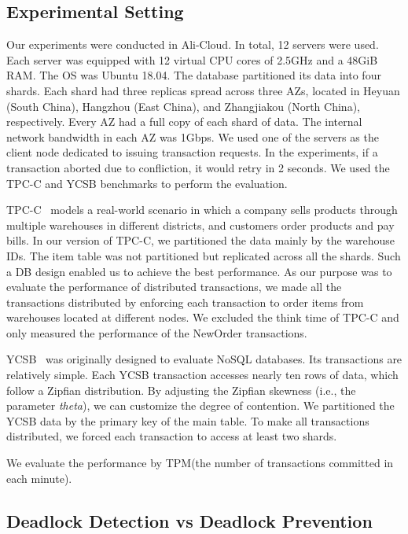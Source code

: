 \documentclass[conference]{IEEEtran}
\begin{document}
\subsection{Experimental Setting}
\label{subsec:exp_setting}

Our experiments were conducted in Ali-Cloud.
In total, 12 servers were used.
Each server was equipped with 12 virtual CPU cores of 2.5GHz and a 48GiB RAM.
The OS was Ubuntu 18.04.
The database partitioned its data into four shards.
Each shard had three replicas spread across three AZs,
located in Heyuan (South China), Hangzhou (East China), and Zhangjiakou (North China), respectively.
Every AZ had a full copy of each shard of data.
The internal network bandwidth in each AZ was 1Gbps.
We used one of the servers as the client node dedicated to issuing transaction requests.
In the experiments, if a transaction aborted due to confliction, it would retry in 2 seconds.
We used the TPC-C and YCSB benchmarks to perform the evaluation.


TPC-C~\cite{TPCC:conf/tpctc/NambiarWMTLCM11} models a real-world scenario in which a company sells products through multiple warehouses in different districts, and customers order products and pay bills.
In our version of TPC-C, we partitioned the data mainly by the warehouse IDs.
The item table was not partitioned but replicated across all the shards.
Such a DB design enabled us to achieve the best performance.
As our purpose was to evaluate the performance of distributed transactions,
we made all the transactions distributed by enforcing each transaction to order items from warehouses located at different nodes.
We excluded the think time of TPC-C and only measured the performance of the NewOrder transactions.


YCSB~\cite{YCSB:conf/cloud/CooperSTRS10} was originally designed to evaluate NoSQL databases.
Its transactions are relatively simple.
Each YCSB transaction accesses nearly ten rows of data, which follow a Zipfian distribution.
By adjusting the Zipfian skewness (i.e., the parameter \emph{theta}), we can customize the degree of contention.
We partitioned the YCSB data by the primary key of the main table.
To make all transactions distributed, we forced each transaction to access at least two shards.

We evaluate the performance by TPM(the number of transactions committed in each minute).


\subsection{Deadlock Detection vs Deadlock Prevention}
\end{document}

